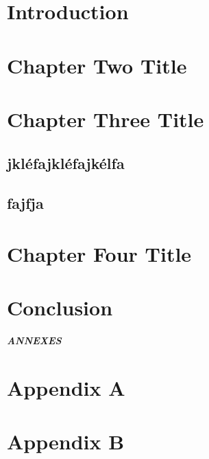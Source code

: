\documentclass[12pt,a4paper,twoside]{article}
\begin{document}
\fancyhead[LE,RO]{\slshape \rightmark}
\fancyhead[LO,RE]{\slshape \leftmark}
\fancyfoot[C]{\thepage}






\newpage
\thispagestyle{plain}
\tableofcontents

\newpage
\section{Introduction}
% 
\newpage
\section{Chapter Two Title}
% 
\newpage
\section{Chapter Three Title}
% 
\subsection{jkléfajkléfajkélfa}
\newpage
\subsection{fajfja}
\newpage
\section{Chapter Four Title}
% 
\newpage
\section{Conclusion}
% 

\newpage
\thispagestyle{empty}
\null\vfill
{\LARGE\centering\bfseries
	\textit{ANNEXES}\par}\vfill\null


\appendix
\newpage
{}
\section{Appendix A}
% 
\newpage
\section{Appendix B}
\end{document}
